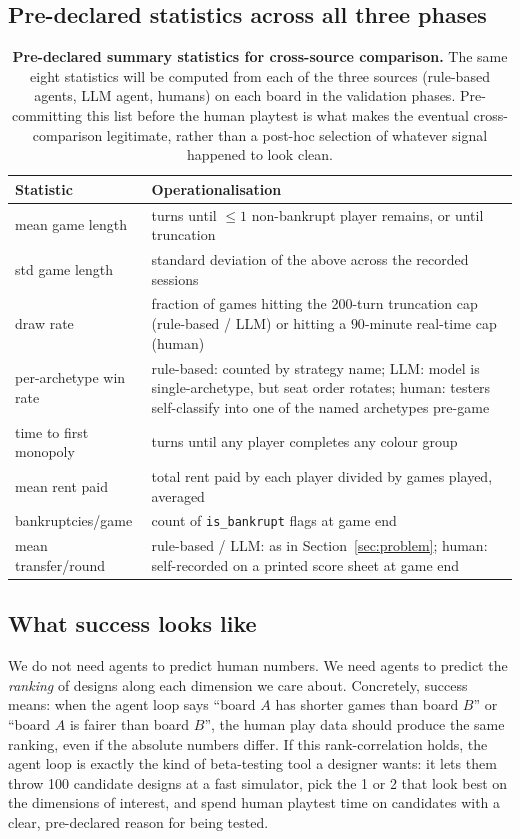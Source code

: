 \documentclass[10pt]{article}
\begin{document}
\subsection{Pre-declared statistics across all three phases}

\begin{table}[h!]
\centering
\small
\begin{tabular}{lp{6cm}}
\toprule
Statistic & Operationalisation \\
\midrule
mean game length     & turns until $\leq 1$ non-bankrupt player remains, or until truncation \\
std game length      & standard deviation of the above across the recorded sessions \\
draw rate            & fraction of games hitting the 200-turn truncation cap (rule-based / LLM) or hitting a $90$-minute real-time cap (human) \\
per-archetype win rate & rule-based: counted by strategy name; LLM: model is single-archetype, but seat order rotates; human: testers self-classify into one of the named archetypes pre-game \\
time to first monopoly & turns until any player completes any colour group \\
mean rent paid       & total rent paid by each player divided by games played, averaged \\
bankruptcies/game    & count of \texttt{is\_bankrupt} flags at game end \\
mean transfer/round  & rule-based / LLM: as in Section~\ref{sec:problem}; human: self-recorded on a printed score sheet at game end \\
\bottomrule
\end{tabular}
\caption{\textbf{Pre-declared summary statistics for cross-source
comparison.} The same eight statistics will be computed from each of
the three sources (rule-based agents, LLM agent, humans) on each board
in the validation phases. Pre-committing this list before the human
playtest is what makes the eventual cross-comparison legitimate, rather
than a post-hoc selection of whatever signal happened to look clean.}
\label{tab:pre_decl_stats}
\end{table}

\subsection{What success looks like}

We do not need agents to predict human numbers. We need agents to
predict the \emph{ranking} of designs along each dimension we care
about. Concretely, success means: when the agent loop says ``board $A$
has shorter games than board $B$'' or ``board $A$ is fairer than board
$B$'', the human play data should produce the same ranking, even if the
absolute numbers differ. If this rank-correlation holds, the agent
loop is exactly the kind of beta-testing tool a designer wants: it
lets them throw 100 candidate designs at a fast simulator, pick the 1
or 2 that look best on the dimensions of interest, and spend human
playtest time on candidates with a clear, pre-declared reason for being
tested.
\end{document}
